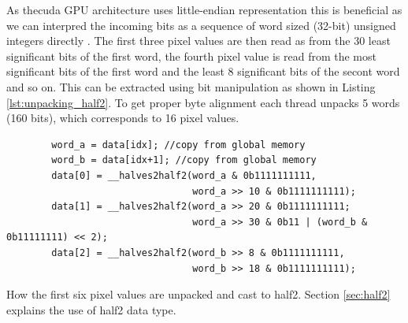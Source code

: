 As the\gls{cuda} GPU architecture uses little-endian representation this is beneficial as we can interpred the incoming bits as a sequence of word sized (32-bit) unsigned integers directly \cite[127]{CUDAProgrammingGuide}.
The first three pixel values are then read as from the 30 least significant bits of the first word, the fourth pixel value is read from the most significant bits of the first word and the least 8 significant bits of the secont word and so on.
This can be extracted using bit manipulation as shown in Listing \ref{lst:unpacking_half2}.
To get proper byte alignment each thread unpacks 5 words (160 bits), which corresponds to 16 pixel values.

\begin{listing}[H]
    \begin{verbatim}
        word_a = data[idx]; //copy from global memory
        word_b = data[idx+1]; //copy from global memory
        data[0] = __halves2half2(word_a & 0b1111111111,
                                 word_a >> 10 & 0b1111111111);
        data[1] = __halves2half2(word_a >> 20 & 0b1111111111;
                                 word_a >> 30 & 0b11 | (word_b & 0b11111111) << 2);
        data[2] = __halves2half2(word_b >> 8 & 0b1111111111,
                                 word_b >> 18 & 0b1111111111);
    \end{verbatim}
    \caption{How the first six pixel values are unpacked and cast to \gls{half2}. Section \ref{sec:half2} explains the use of \gls{half2} data type.}
    \label{lst:unpacking_half2}
\end{listing}
